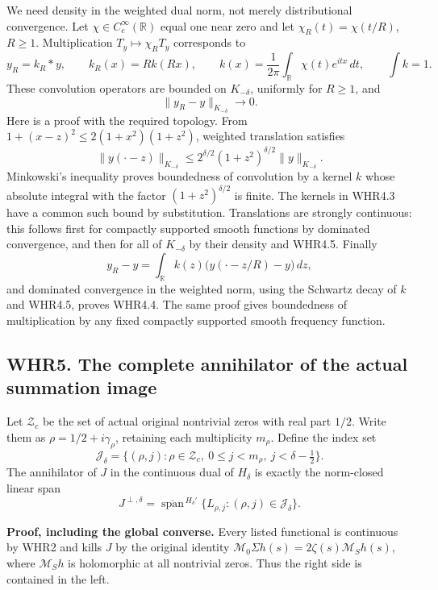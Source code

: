 We need density in the weighted dual norm, not merely distributional
convergence. Let \(\chi\in C_c^\infty(\mathbb R)\) equal one near zero
and let \(\chi_R(t)=\chi(t/R)\), \(R\geq1\). Multiplication
\(T_y\mapsto\chi_RT_y\) corresponds to \[
 y_R=k_R*y,\qquad
 k_R(x)=Rk(Rx),\qquad
 k(x)=\frac1{2\pi}\int_{\mathbb R}\chi(t)e^{itx}\,dt,
 \qquad\int k=1.
 \tag{WHR4.3}
\] These convolution operators are bounded on \(K_{-\delta}\), uniformly
for \(R\geq1\), and \[
 \|y_R-y\|_{K_{-\delta}}\longrightarrow0.
 \tag{WHR4.4}
\] Here is a proof with the required topology. From
\(1+(x-z)^2\leq2(1+x^2)(1+z^2)\), weighted translation satisfies \[
 \|y(\cdot-z)\|_{K_{-\delta}}
 \leq2^{\delta/2}(1+z^2)^{\delta/2}\|y\|_{K_{-\delta}}.
 \tag{WHR4.5}
\] Minkowski's inequality proves boundedness of convolution by a kernel
\(k\) whose absolute integral with the factor \((1+z^2)^{\delta/2}\) is
finite. The kernels in WHR4.3 have a common such bound by substitution.
Translations are strongly continuous: this follows first for compactly
supported smooth functions by dominated convergence, and then for all of
\(K_{-\delta}\) by their density and WHR4.5. Finally \[
 y_R-y=\int_{\mathbb R}k(z)
                    \bigl(y(\cdot-z/R)-y\bigr)\,dz,
\] and dominated convergence in the weighted norm, using the Schwartz
decay of \(k\) and WHR4.5, proves WHR4.4. The same proof gives
boundedness of multiplication by any fixed compactly supported smooth
frequency function.

\subsection{WHR5. The complete annihilator of the actual summation
image}\label{whr5.-the-complete-annihilator-of-the-actual-summation-image}

Let \(\mathscr Z_c\) be the set of actual original nontrivial zeros with
real part \(1/2\). Write them as \(\rho=1/2+i\gamma_\rho\), retaining
each multiplicity \(m_\rho\). Define the index set \[
 \mathscr J_\delta=\{(\rho,j):\rho\in\mathscr Z_c,
                   \ 0\leq j<m_\rho,
                   \ j<\delta-\tfrac12\}.
 \tag{WHR5.1}
\] The annihilator of \(J\) in the continuous dual of \(H_\delta\) is
exactly the norm-closed linear span \[
 \boxed{J^{\perp,\delta}
   =\overline{\operatorname{span}}^{\,H_\delta'}
                  \{L_{\rho,j}:(\rho,j)\in\mathscr J_\delta\}.}
 \tag{WHR5.2}
\]

\textbf{Proof, including the global converse.} Every listed functional
is continuous by WHR2 and kills \(J\) by the original identity
\(\mathcal M_0\Sigma h(s)=2\zeta(s)\mathcal M_Sh(s)\), where
\(\mathcal M_Sh\) is holomorphic at all nontrivial zeros. Thus the right
side is contained in the left.

